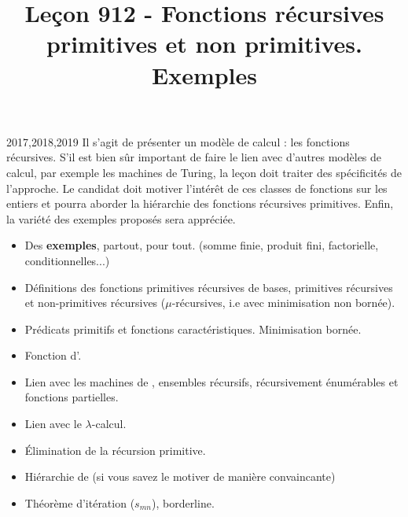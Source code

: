 \documentclass{agregfiche}
\title{Leçon 912 - Fonctions récursives primitives et non primitives. Exemples}
\begin{document}
\maketitle

\secrapports
\begin{rapport}{2017,2018,2019}
	Il s’agit de présenter un modèle de calcul : les fonctions récursives. S’il est bien sûr important de faire
	le lien avec d’autres modèles de calcul, par exemple les machines de Turing, la leçon doit traiter des
	spécificités de l’approche. Le candidat doit motiver l’intérêt de ces classes de fonctions sur les entiers et
	pourra aborder la hiérarchie des fonctions récursives primitives. Enfin, la variété des exemples proposés
	sera appréciée.
\end{rapport}

\secindispensables

\begin{itemize}
	\item Des \textbf{exemples}, partout, pour tout. (somme finie, produit fini, factorielle, conditionnelles...)
	\item Définitions des fonctions primitives récursives de bases, primitives récursives et non-primitives récursives ($\mu$-récursives, i.e avec minimisation non bornée).
	\item Prédicats primitifs et fonctions caractéristiques. Minimisation bornée.

\end{itemize}

\secasavoir

\begin{itemize}
	\item Fonction d'.
	\item Lien avec les machines de , ensembles récursifs, récursivement énumérables et fonctions partielles.
\end{itemize}


\secidees

\begin{itemize}
       \item Lien avec le $\lambda$-calcul.
       \item Élimination de la récursion primitive.
       \item Hiérarchie de  (si vous savez le motiver de manière convaincante)
       \item Théorème d'itération ($s_{mn}$), borderline.
\end{itemize}
\end{document}
